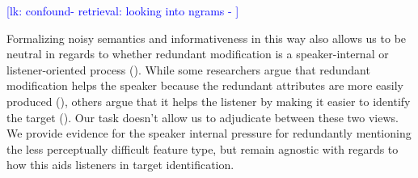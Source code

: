 \documentclass[12pt,letterpaper]{article}
\newcommand{\lk}[1]{\textcolor{Blue}{[lk: #1]}}
\begin{document}
\lk{confound- retrieval: looking into ngrams - }

Formalizing noisy semantics and informativeness in this way also allows us to be neutral in regards to whether redundant modification is a speaker-internal or listener-oriented process (\citealt{Arnold2008}). While some researchers argue that redundant modification helps the speaker because the redundant attributes are more easily produced (\citealt{DaviesKatsos2013, KoolenEtAl2013}), others argue that it helps the listener by making it easier to identify the target (\citealt{FussellKraus1989a, ArtsEtAl2011,RubioFernandez2016,Rehrig2021}). Our task doesn't allow us to adjudicate between these two views. We provide evidence for the speaker internal pressure for redundantly mentioning the less perceptually difficult feature type, but remain agnostic with regards to how this aids listeners in target identification.

\end{document}

